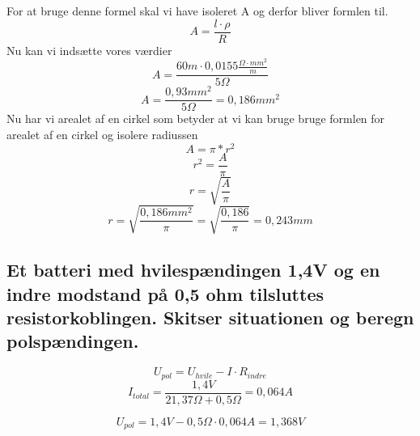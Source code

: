 For at bruge denne formel skal vi have isoleret A og derfor bliver formlen til.
\begin{equation*}
    A=\frac{l\cdot\rho}{R}
\end{equation*}
Nu kan vi indsætte vores værdier
\begin{equation*}
    A=\frac{60m\cdot0,0155\frac{\Omega\cdot mm^{2}}{m}}{5\Omega}
\end{equation*}
\begin{equation*}
    A=\frac{0,93mm^{2}}{5\Omega}=0,186mm^{2}
\end{equation*}
Nu har vi arealet af en cirkel som betyder at vi kan bruge bruge formlen for arealet af en cirkel og isolere radiussen
\begin{equation*}
    A=\pi*r^{2}
\end{equation*}
\begin{equation*}
    r^{2}=\frac{A}{\pi}
\end{equation*}
\begin{equation*}
    r=\sqrt{\frac{A}{\pi}}
\end{equation*}
\begin{equation*}
    r=\sqrt{\frac{0,186mm^{2}}{\pi}} = \sqrt{\frac{0,186}{\pi}} = 0,243mm
\end{equation*}

\subsection{Et batteri med hvilespændingen 1,4V og en indre modstand på 0,5 ohm tilsluttes resistorkoblingen. Skitser situationen og beregn polspændingen.}
\begin{equation*}
    U_{pol}=U_{hvile}-I\cdot R_{indre}
\end{equation*}
\begin{equation*}
    I_{total}=\frac{1,4V}{21,37\Omega+0,5\Omega}=0,064A
\end{equation*}

\begin{equation*}
    U_{pol}=1,4V-0,5\Omega\cdot 0,064A=1,368V
\end{equation*}
\newpage